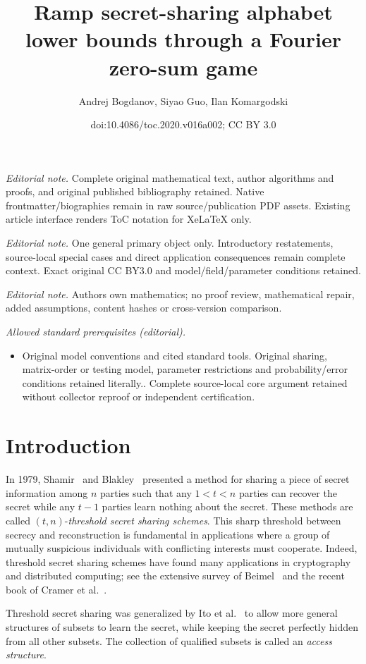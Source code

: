 \documentclass[11pt]{article}
\title{Ramp secret-sharing alphabet lower bounds through a Fourier zero-sum game}
\author{Andrej Bogdanov, Siyao Guo, Ilan Komargodski}
\date{doi:10.4086/toc.2020.v016a002; CC BY 3.0}
\numberwithin{equation}{section}
\theoremstyle{definition}
\theoremstyle{plain}
\begin{document}
\maketitle
\noindent\textit{Editorial note.} Complete original mathematical text, author algorithms and proofs, and original published bibliography retained. Native frontmatter/biographies remain in raw source/publication PDF assets. Existing article interface renders ToC notation for XeLaTeX only.\par\medskip
\noindent\textit{Editorial note.} One general primary object only. Introductory restatements, source-local special cases and direct application consequences remain complete context. Exact original CC BY3.0 and model/field/parameter conditions retained.\par\medskip
\noindent\textit{Editorial note.} Authors own mathematics; no proof review, mathematical repair, added assumptions, content hashes or cross-version comparison.\par\medskip
\noindent\textit{Allowed standard prerequisites (editorial).}\begin{itemize}
\item Original model conventions and cited standard tools. Original sharing, matrix-order or testing model, parameter restrictions and probability/error conditions retained literally.. Complete source-local core argument retained without collector reproof or independent certification.
\end{itemize}\medskip
\section{Introduction}
In 1979, Shamir~\cite{Shamir79} and Blakley~\cite{Blakley79} presented a method
for sharing a piece of secret information among $n$ parties such that any
$1<t<n$ parties can recover the secret while any $t-1$ parties learn 
	nothing about the secret. These methods are called $(t,n)$-\emph{threshold
	secret sharing schemes}. This sharp threshold between secrecy and
reconstruction is fundamental in applications where a group of mutually
suspicious individuals with conflicting interests must cooperate. Indeed,
threshold secret sharing schemes have found many applications in cryptography
and distributed computing; see the extensive survey of Beimel~\cite{Beimel11}
and the recent book of Cramer et al.~\cite{CDN2015}.

Threshold secret sharing was generalized by Ito et al.~\cite{ISN93} to 
allow more general structures of subsets to learn the
secret, while keeping the secret perfectly hidden from all other subsets. The
collection of qualified subsets is called an \emph{access structure}.
\end{document}
